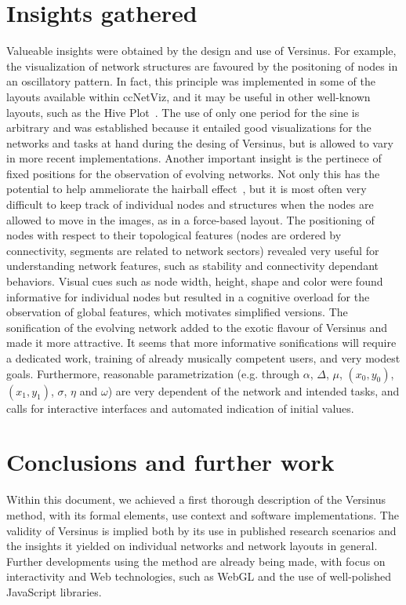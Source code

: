 \documentclass[runningheads]{llncs}
\begin{document}
\section{Insights gathered}\label{sec:ins}
Valueable insights were obtained by the design and use of Versinus.
For example, the visualization of network structures are favoured by the positoning of nodes in an oscillatory pattern. In fact, this principle was implemented in some of the layouts available within ccNetViz, and it may be useful in other well-known layouts, such as the Hive Plot~\cite{hive}. The use of only one period for the sine is arbitrary and was established because it entailed good visualizations for the networks and tasks at hand during the desing of Versinus, but is allowed to vary in more recent implementations.
Another important insight is the pertinece of fixed positions for the observation of evolving networks. Not only this has the potential to help ammeliorate the hairball effect~\cite{hairball}, but it is most often very difficult to keep track of individual nodes and structures when the nodes are allowed to move in the images, as in a force-based layout.
The positioning of nodes with respect to their topological features (nodes are ordered by connectivity, segments are related to network sectors) revealed very useful for understanding network features, such as stability and connectivity dependant behaviors.
Visual cues such as node width, height, shape and color were found informative for individual nodes but resulted in a cognitive overload for the observation of global features, which motivates simplified versions.
The sonification of the evolving network added to the exotic flavour of Versinus and made it more attractive. It seems that more informative sonifications will require a dedicated work, training of already musically competent users, and very modest goals. 
Furthermore, reasonable parametrization (e.g. through $\alpha$, $\Delta$, $\mu$, $(x_0, y_0)$, $(x_1, y_1)$, $\sigma$, $\eta$ and $\omega$) are very dependent of the network and intended tasks, and calls for interactive interfaces and automated indication of initial values.

\section{Conclusions and further work}\label{sec:con}
Within this document, we achieved a first thorough description of the Versinus method, with its formal elements, use context and software implementations.
The validity of Versinus is implied both by its use in published research scenarios and the insights it yielded on individual networks and network layouts in general.
Further developments using the method are already being made, with focus on interactivity and Web technologies, such as WebGL and the use of well-polished JavaScript libraries.
\end{document}
